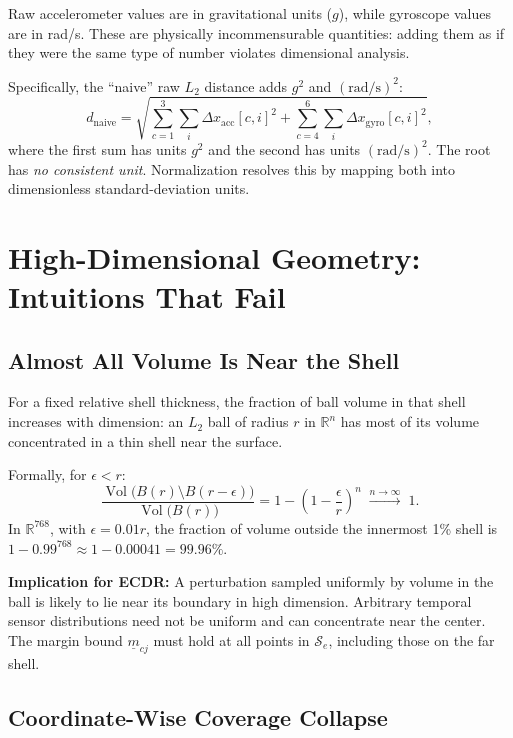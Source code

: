 \documentclass[11pt, a4paper]{article}
\theoremstyle{definition}
\theoremstyle{plain}
\newcommand{\R}{\mathbb{R}}
\newcommand{\Se}{\mathcal{S}_e}
\begin{document}
Raw accelerometer values are in gravitational units ($g$), while gyroscope values
are in rad/s. These are physically incommensurable quantities: adding them as if
they were the same type of number violates dimensional analysis.

Specifically, the ``naive'' raw $L_2$ distance adds $g^2$ and $(\mathrm{rad/s})^2$:
\[
  d_{\text{naive}} = \sqrt{\sum_{c=1}^3 \sum_i \Delta x_{\text{acc}}[c,i]^2
                           + \sum_{c=4}^6 \sum_i \Delta x_{\text{gyro}}[c,i]^2},
\]
where the first sum has units $g^2$ and the second has units $(\mathrm{rad/s})^2$.
The root has \emph{no consistent unit}. Normalization resolves this by mapping both
into dimensionless standard-deviation units.

\section{High-Dimensional Geometry: Intuitions That Fail}

\subsection{Almost All Volume Is Near the Shell}

For a fixed relative shell thickness, the fraction of ball volume in that shell increases with dimension: an $L_2$ ball of radius $r$ in $\R^n$ has most
of its volume concentrated in a thin shell near the surface.

Formally, for $\epsilon < r$:
\[
  \frac{\operatorname{Vol}\bigl(B(r) \setminus B(r - \epsilon)\bigr)}
       {\operatorname{Vol}\bigl(B(r)\bigr)}
  = 1 - \left(1 - \frac{\epsilon}{r}\right)^n \;\xrightarrow{n \to \infty}\; 1.
\]
In $\R^{768}$, with $\epsilon = 0.01r$, the fraction of volume outside the
innermost 1\% shell is $1 - 0.99^{768} \approx 1 - 0.00041 = 99.96\%$.

\textbf{Implication for ECDR:} A perturbation sampled uniformly by volume in the ball is likely to lie near its boundary in high dimension. Arbitrary temporal sensor distributions need not be uniform and can concentrate near the center. The margin
bound $\underline{m}_{cj}$ must hold at all points in $\Se$, including those on
the far shell.

\subsection{Coordinate-Wise Coverage Collapse}
\end{document}
